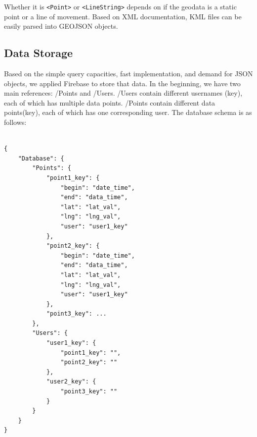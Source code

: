 \documentclass{ucsdreport}
\begin{document}
Whether it is \texttt{<Point>} or \texttt{<LineString>} depends on if the 
geodata is a static point or a line of movement. Based on XML documentation,
KML files can be easily parsed into GEOJSON objects.

\subsection{Data Storage}
Based on the simple query capacities, fast implementation, and demand for JSON 
objects, we applied Firebase to store that data. In the beginning, we have two
main references: /Points and /Users. /Users contain different usernames (key), 
each of which has multiple data points. /Points contain different data 
points(key), each of which has one corresponding user. The database schema 
is as follows:
\begin{verbatim}

{
    "Database": {
        "Points": {
            "point1_key": {
                "begin": "date_time",
                "end": "data_time",
                "lat": "lat_val",
                "lng": "lng_val",
                "user": "user1_key"
            },
            "point2_key": {
                "begin": "date_time",
                "end": "data_time",
                "lat": "lat_val",
                "lng": "lng_val",
                "user": "user1_key"
            },
            "point3_key": ...
        },
        "Users": {
            "user1_key": {
                "point1_key": "",
                "point2_key": ""
            },
            "user2_key": {
                "point3_key": ""
            }
        }
    }
}

\end{verbatim}
\end{document}
